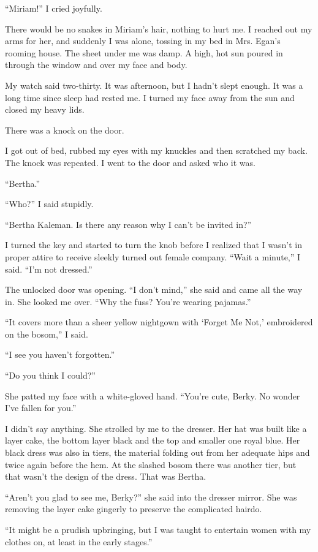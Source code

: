 \documentclass{novel}
\begin{document}
“Miriam!” I cried joyfully.

There would be no snakes in Miriam’s hair, nothing to hurt me. I reached out my arms for her, and suddenly I was alone, tossing in my bed in Mrs. Egan’s rooming house. The sheet under me was damp. A high, hot sun poured in through the window and over my face and body.

My watch said two-thirty. It was afternoon, but I hadn’t slept enough. It was a long time since sleep had rested me. I turned my face away from the sun and closed my heavy lids.

\scenestars

There was a knock on the door.

I got out of bed, rubbed my eyes with my knuckles and then scratched my back. The knock was repeated. I went to the door and asked who it was. 

“Bertha.”

“Who?” I said stupidly.

“Bertha Kaleman. Is there any reason why I can’t be invited in?”

I turned the key and started to turn the knob before I realized that I wasn’t in proper attire to receive sleekly turned out female company. “Wait a minute,” I said. “I’m not dressed.”

The unlocked door was opening. “I don’t mind,” she said and came all the way in. She looked me over. “Why the fuss? You’re wearing pajamas.”

“It covers more than a sheer yellow nightgown with ‘Forget Me Not,’ embroidered on the bosom,” I said.

“I see you haven’t forgotten.”

“Do you think I could?”

She patted my face with a white-gloved hand. “You’re cute, Berky. No wonder I’ve fallen for you.”

I didn’t say anything. She strolled by me to the dresser. Her hat was built like a layer cake, the bottom layer black and the top and smaller one royal blue. Her black dress was also in tiers, the material folding out from her adequate hips and twice again before the hem. At the slashed bosom there was another tier, but that wasn’t the design of the dress. That was Bertha.

“Aren’t you glad to see me, Berky?” she said into the dresser mirror. She was removing the layer cake gingerly to preserve the complicated hairdo.

“It might be a prudish upbringing, but I was taught to entertain women with my clothes on, at least in the early stages.”
\end{document}
